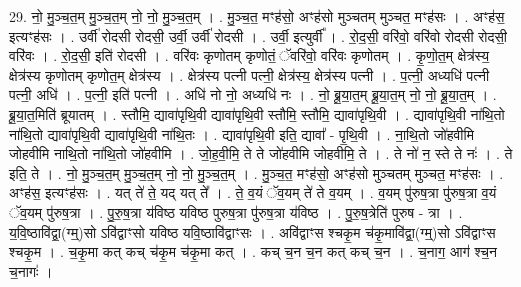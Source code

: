\documentclass[17pt]{extarticle}
\begin{document}
29. नो॒ मु॒ञ्च॒त॒म् मु॒ञ्च॒त॒म् नो॒ नो॒ मु॒ञ्च॒त॒म् । . मु॒ञ्च॒त॒ मꣳह॑सो॒ अꣳह॑सो मुञ्चतम् मुञ्चत॒ मꣳह॑सः । . अꣳह॑स॒ इत्यꣳह॑सः । . उर्वी॑ रोदसी रोदसी॒ उर्वी॒ उर्वी॑ रोदसी । . उर्वी॒ इत्युर्वी᳚ । . रो॒द॒सी॒ वरि॑वो॒ वरि॑वो रोदसी रोदसी॒ वरि॑वः । . रो॒द॒सी॒ इति॑ रोदसी । . वरि॑वः कृणोतम् कृणोतं॒ ॅवरि॑वो॒ वरि॑वः कृणोतम् । . कृ॒णो॒त॒म् क्षेत्र॑स्य॒ क्षेत्र॑स्य कृणोतम् कृणोत॒म् क्षेत्र॑स्य । . क्षेत्र॑स्य पत्नी पत्नी॒ क्षेत्र॑स्य॒ क्षेत्र॑स्य पत्नी । . प॒त्नी॒ अध्यधि॑ पत्नी पत्नी॒ अधि॑ । . प॒त्नी॒ इति॑ पत्नी । . अधि॑ नो नो॒ अध्यधि॑ नः । . नो॒ ब्रू॒या॒त॒म् ब्रू॒या॒त॒म् नो॒ नो॒ ब्रू॒या॒त॒म् । . ब्रू॒या॒त॒मिति॑ ब्रूयातम् । . स्तौमि॒ द्यावा॑पृथि॒वी द्यावा॑पृथि॒वी स्तौमि॒ स्तौमि॒ द्यावा॑पृथि॒वी । . द्यावा॑पृथि॒वी ना॑थि॒तो ना॑थि॒तो द्यावा॑पृथि॒वी द्यावा॑पृथि॒वी ना॑थि॒तः । . द्यावा॑पृथि॒वी इति॒ द्यावा᳚ - पृ॒थि॒वी । . ना॒थि॒तो जो॑हवीमि जोहवीमि नाथि॒तो ना॑थि॒तो जो॑हवीमि । . जो॒ह॒वी॒मि॒ ते ते जो॑हवीमि जोहवीमि॒ ते । . ते नो॑ न॒ स्ते ते नः॑ । . ते इति॒ ते । . नो॒ मु॒ञ्च॒त॒म् मु॒ञ्च॒त॒म् नो॒ नो॒ मु॒ञ्च॒त॒म् । . मु॒ञ्च॒त॒ मꣳह॑सो॒ अꣳह॑सो मुञ्चतम् मुञ्चत॒ मꣳह॑सः । . अꣳह॑स॒ इत्यꣳह॑सः । . यत् ते॑ ते॒ यद् यत् ते᳚ । . ते॒ व॒यं ॅव॒यम् ते॑ ते व॒यम् । . व॒यम् पु॑रुष॒त्रा पु॑रुष॒त्रा व॒यं ॅव॒यम् पु॑रुष॒त्रा । . पु॒रु॒ष॒त्रा य॑विष्ठ यविष्ठ पुरुष॒त्रा पु॑रुष॒त्रा य॑विष्ठ । . पु॒रु॒ष॒त्रेति॑ पुरुष - त्रा । . य॒वि॒ष्ठावि॑द्वा॒(ग्म्॒)सो ऽवि॑द्वाꣳसो यविष्ठ यवि॒ष्ठावि॑द्वाꣳसः । . अवि॑द्वाꣳस श्चकृ॒म च॑कृ॒मावि॑द्वा॒(ग्म्॒)सो ऽवि॑द्वाꣳस श्चकृ॒म । . च॒कृ॒मा कत् कच् च॑कृ॒म च॑कृ॒मा कत् । . कच् च॒न च॒न कत् कच् च॒न । . च॒नाग॒ आग॑ श्च॒न च॒नागः॑ । \newline
\end{document}
